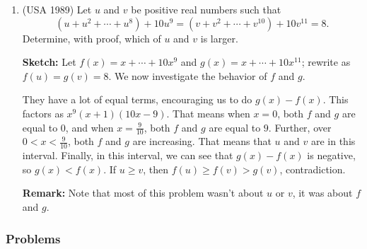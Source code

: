 \documentclass[11pt,paper=letter]{scrartcl}
\begin{document}
\begin{enumerate}
\item (USA 1989) Let $u$ and $v$ be positive real numbers such that \[
  (u + u^2 + \cdots + u^8) + 10u^9 = (v + v^2 + \cdots + v^{10}) + 10v^{11} = 8.
\]
Determine, with proof, which of $u$ and $v$ is larger.

\textbf{Sketch:} Let $f(x) = x + \cdots + 10x^9$ and $g(x) = x + \cdots + 10x^{11}$; rewrite as $f(u) = g(v) = 8$. We now investigate the behavior of $f$ and $g$.

They have a lot of equal terms, encouraging us to do $g(x) - f(x)$. This factors as $x^9(x + 1)(10x - 9)$. That means when $x = 0$, both $f$ and $g$ are equal to $0$, and when $x = \frac9{10}$, both $f$ and $g$ are equal to $9$. Further, over $0 < x < \frac9{10}$, both $f$ and $g$ are increasing. That means that $u$ and $v$ are in this interval. Finally, in this interval, we can see that $g(x) - f(x)$ is negative, so $g(x) < f(x)$. If $u \ge v$, then $f(u) \ge f(v) > g(v)$, contradiction.

\textbf{Remark:} Note that most of this problem wasn't about $u$ or $v$, it was about $f$ and $g$.

\end{enumerate}

\subsubsection*{Problems}
\end{document}
